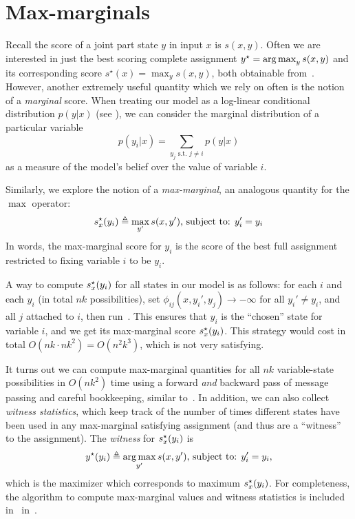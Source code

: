 

\section{Max-marginals}\label{sec:max-marginals}

Recall the score  of a joint part state $y$ in input $x$ is $s(x,y)$. Often we
are interested in just the best scoring complete assignment $y^\star = 
\mathop{\arg\max}_y s(x,y)$ and its corresponding score $s^\star(x) = \max_y s(x,y)$, 
both obtainable from~.  However, another extremely useful 
quantity which we rely on often is the notion of a {\em marginal} score.  When 
treating our model as a log-linear conditional distribution $p(y|x)$ (see 
), we can consider the marginal distribution of a particular 
variable
\begin{equation}
p(y_i|x) = \sum_{y_j \text{ s.t. } j \neq i} p(y|x)
\end{equation}
as a measure of the model's belief over the value of variable $i$.  

Similarly, we explore the notion of a {\em max-marginal}, an analogous quantity 
for the $\max$ operator:
\begin{align}
s^\star_x(y_i) \triangleq  \max_{y'} s(x,y') \text{, subject to: } y_i' = y_i
 \end{align}
In words, the max-marginal score for $y_i$ is the score of the best full 
assignment restricted to fixing variable $i$ to be $y_i$. 

A \naive way to compute $s^\star_x(y_i)$ for all states in our model is as follows: for 
each $i$ and each $y_i$ (in total $nk$ possibilities), set 
$\phi_{ij}(x,y_i',y_j) \rightarrow -\infty$ for all $y_i' \neq y_i$, and all 
$j$ attached to $i$, then run~.  This ensures that $y_i$ 
is the ``chosen'' state for variable $i$, and we get its max-marginal score 
$s^\star_x(y_i)$.  This strategy would cost in total $O(nk \cdot nk^2) = O(n^2k^3)$, 
which is not very satisfying.

It turns out we can compute max-marginal quantities for all $nk$ variable-state 
possibilities in $O(nk^2)$ time using a forward {\em and } backward pass of 
message passing and careful bookkeeping, similar to~.  In 
addition, we can also collect {\em witness statistics}, which keep track of the 
number of times different states have been used in any max-marginal satisfying 
assignment (and thus are a ``witness'' to the assignment).  The {\em witness} 
for $s^\star_x(y_i)$ is 
\begin{equation}
y^\star(y_i) \triangleq  \mathop{\arg\max}_{y'} s(x,y') \text{, subject to: } y_i' = y_i,
\end{equation}
which is the maximizer which corresponds to maximum $s^\star_x(y_i)$.  For completeness, the algorithm to compute max-marginal values and witness statistics is included in~\secref{} in~.


